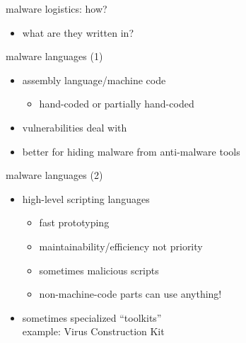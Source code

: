 \begin{frame}{malware logistics: how?}
    \begin{itemize}
    \item what are they written in?
    \end{itemize}
\end{frame}

\begin{frame}{malware languages (1)}
    \begin{itemize}
    \item assembly language/machine code
        \begin{itemize}
        \item hand-coded or partially hand-coded
        \end{itemize}
    \vspace{.5cm}
    \item vulnerabilities deal with 
    \item better for hiding malware from anti-malware tools
    \end{itemize}
\end{frame}

\begin{frame}{malware languages (2)}
    \begin{itemize}
    \item high-level scripting languages
        \begin{itemize}
        \item fast prototyping
        \item maintainability/efficiency not priority
        \item sometimes malicious scripts
        \item non-machine-code parts can use anything!
        \end{itemize}
    \item sometimes specialized ``toolkits'' \\
          example: Virus Construction Kit
    \end{itemize}
\end{frame}



